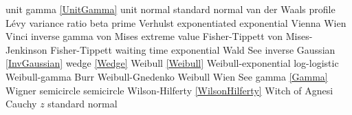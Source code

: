 unit gamma					\dotfill	\eqref{UnitGamma} 					\ncite	%
unit normal					\dotfill	standard normal 					\ncite	%
%
van der Waals profile 			\dotfill	L\'{e}vy 							\ncite	%
variance ratio					\dotfill	beta prime 						\ncite	%
Verhulst						\dotfill	exponentiated exponential					 
Vienna 						\dotfill	Wien 							\ncite	%
Vinci 						\dotfill	inverse gamma 					\ncite	%
von Mises extreme value			\dotfill	Fisher-Tippett 						\ncite	%
von Mises-Jenkinson 			\dotfill	Fisher-Tippett 						\ncite	%
%
waiting time					\dotfill	exponential 						\ncite	%
Wald							\dotfill	See inverse Gaussian	 \eqref{InvGaussian}				\ncite	%
wedge						\dotfill	\eqref{Wedge}  						\ncite	%
Weibull 						\dotfill	\eqref{Weibull} 						\ncite	%
Weibull-exponential 				\dotfill	log-logistic 						\ncite	%
Weibull-gamma					\dotfill	Burr								\ncite	%
Weibull-Gnedenko				\dotfill	Weibull 							\ncite	%
Wien							\dotfill	See gamma \eqref{Gamma}			\ncite	%
Wigner semicircle				\dotfill	semicircle 						\ncite	%
Wilson-Hilferty					\dotfill	\eqref{WilsonHilferty} 				\ncite	%
Witch of Agnesi					\dotfill	Cauchy								%
%	
$z$							\dotfill	standard normal 					\ncite	%



\clearpage

